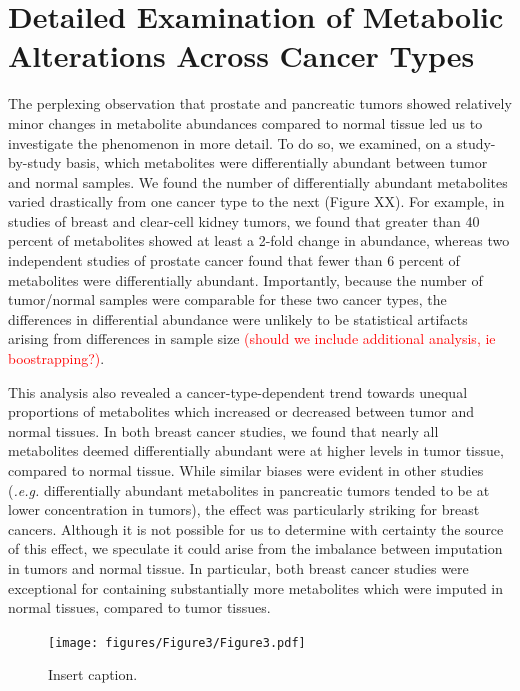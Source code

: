\documentclass[10pt]{article}
\begin{document}
\section{Detailed Examination of Metabolic Alterations Across Cancer Types}
The perplexing observation that prostate and pancreatic tumors showed relatively minor changes in metabolite abundances compared to normal tissue led us to investigate the phenomenon in more detail. To do so, we examined, on a study-by-study basis, which metabolites were differentially abundant between tumor and normal samples. We found the number of differentially abundant metabolites varied drastically from one cancer type to the next (Figure XX). For example, in studies of breast and clear-cell kidney tumors, we found that greater than 40 percent of metabolites showed at least a 2-fold change in abundance, whereas two independent studies of prostate cancer found that fewer than 6 percent of metabolites were differentially abundant. Importantly, because the number of tumor/normal samples were comparable for these two cancer types, the differences in differential abundance were unlikely to be statistical artifacts arising from differences in sample size \textcolor{red}{(should we include additional analysis, ie boostrapping?)}.

This analysis also revealed a cancer-type-dependent trend towards unequal proportions of metabolites which increased or decreased between tumor and normal tissues. In both breast cancer studies, we found that nearly all metabolites deemed differentially abundant were at higher levels in tumor tissue, compared to normal tissue. While similar biases were evident in other studies (\textit{.e.g.} differentially abundant metabolites in pancreatic tumors tended to be at lower concentration in tumors), the effect was particularly striking for breast cancers. Although it is not possible for us to determine with certainty the source of this effect, we speculate it could arise from the imbalance between imputation in tumors and normal tissue. In particular, both breast cancer studies were exceptional for containing substantially more metabolites which were imputed in normal tissues, compared to tumor tissues.

\begin{figure}[ht!]
  \centering
     \texttt{[image: figures/Figure3/Figure3.pdf]}
  \caption{Insert caption. }
     \label{fig:Fig3}
\end{figure}
\end{document}
